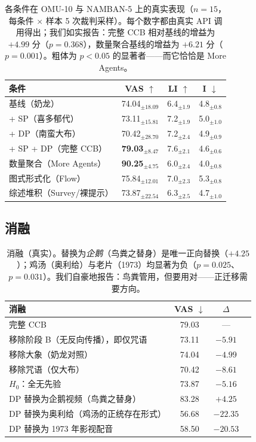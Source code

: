 \documentclass[journal]{IEEEtran}
\begin{document}
\begin{table}[H]
\begin{center}
\small
\begin{tabular}{@{}lccc@{}}
\toprule
条件 & VAS $\uparrow$ & LI $\uparrow$ & I $\downarrow$ \\
\midrule
基线（奶龙） & 74.04$_{\pm18.09}$ & 6.4$_{\pm1.9}$ & 4.8$_{\pm0.8}$ \\
+ SP（喜多郁代） & 73.11$_{\pm15.81}$ & 7.2$_{\pm1.9}$ & 5.0$_{\pm1.0}$ \\
+ DP（南蛮大布） & 70.42$_{\pm28.70}$ & 7.2$_{\pm2.4}$ & 4.9$_{\pm0.9}$ \\
+ SP + DP（完整 CCB） & \textbf{79.03$_{\pm8.47}$} & 7.6$_{\pm2.1}$ & 4.6$_{\pm0.6}$ \\
\midrule
数量聚合（More Agents） & \textbf{90.25$_{\pm4.75}$} & 6.0$_{\pm2.4}$ & 4.0$_{\pm0.8}$ \\
图式形式化（Flow） & 75.84$_{\pm12.01}$ & 7.0$_{\pm2.3}$ & 5.3$_{\pm0.8}$ \\
综述堆积（Survey/裸提示） & 73.87$_{\pm22.54}$ & 6.3$_{\pm2.5}$ & 4.7$_{\pm1.0}$ \\
\bottomrule
\end{tabular}
\end{center}
\caption{各条件在 OMU-10 与 NAMBAN-5 上的真实表现（$n=15$，每条件 $\times$ 样本 5 次裁判采样）。每个数字都由真实 API 调用得出；我们如实报告：完整 CCB 相对基线的增益为 $+4.99$ 分（$p=0.368$），数量聚合基线的增益为 $+6.21$ 分（$p=0.001$）。粗体为 $p<0.05$ 的显著者——而它恰恰是 More Agents。}
\label{Exp}
\end{table}

\subsection{消融}

\begin{table}[H]
\begin{center}
\small
\begin{tabular}{@{}lccc@{}}
\toprule
消融 & VAS $\downarrow$ & $\Delta$ \\
\midrule
完整 CCB & 79.03 & --- \\
\quad 移除阶段 B（无反向传播），即仅咒语 & 73.11 & $-5.91$ \\
\quad 移除大象（奶龙对照） & 74.04 & $-4.99$ \\
\quad 移除咒语（仅大布） & 70.42 & $-8.61$ \\
\quad $H_0$：全无先验 & 73.87 & $-5.16$ \\
\midrule
DP 替换为企鹅视频（鸟粪之替身） & 83.28 & $+4.25$ \\
DP 替换为奥利给（鸡汤的正统存在形式） & 56.68 & $-22.35$ \\
DP 替换为 1973 年影视配音 & 58.50 & $-20.53$ \\
\bottomrule
\end{tabular}
\end{center}
\caption{消融（真实）。替换为\emph{企鹅}（鸟粪之替身）是唯一正向替换（$+4.25$）；鸡汤（奥利给）与老片（1973）均显著为负（$p=0.025$、$p=0.031$）。我们自豪地报告：鸟粪管用，但要用对——正迁移需要方向。}
\label{Abl}
\end{table}
\end{document}

